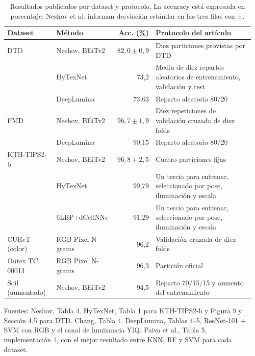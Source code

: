 \documentclass[a4paper,fleqn]{cas-sc}
\begin{document}
\begin{table}[pos=htbp]
\centering
\caption{Resultados publicados por dataset y protocolo. La accuracy está expresada en porcentaje. Neshov et al. informan desviación estándar en las tres filas con $\pm$.}
\label{tab:publicados}
\small
\setlength{\tabcolsep}{4pt}
\begin{tabular}{@{}p{}p{}r p{}@{}}
\toprule
Dataset & Método & Acc. (\%) & Protocolo del artículo \\
\midrule
DTD & Neshov, BEiTv2 \citep{neshov2025aggregation} & $82{,}0\pm0{,}9$ & Diez particiones provistas por DTD \\
 & HyTexNet \citep{gupta2026hytexnet} & 73,2 & Media de diez repartos aleatorios de entrenamiento, validación y test \\
 & DeepLumina \citep{simon2022deeplumina} & 73,63 & Reparto aleatorio 80/20 \\
\addlinespace
FMD & Neshov, BEiTv2 \citep{neshov2025aggregation} & $96{,}7\pm1{,}9$ & Diez repeticiones de validación cruzada de diez folds \\
 & DeepLumina \citep{simon2022deeplumina} & 90,15 & Reparto aleatorio 80/20 \\
\addlinespace
KTH-TIPS2-b & Neshov, BEiTv2 \citep{neshov2025aggregation} & $96{,}8\pm2{,}5$ & Cuatro particiones fijas \\
 & HyTexNet \citep{gupta2026hytexnet} & 99,79 & Un tercio para entrenar, seleccionado por pose, iluminación y escala \\
 & 6LBP+dCellNNs \citep{chang2024cellnn} & 91,29 & Un tercio para entrenar, seleccionado por pose, iluminación y escala \\
\addlinespace
CUReT (color) & RGB Pixel N-grams \citep{paiva2023rgb} & 96,2 & Validación cruzada de diez folds \\
Outex TC 00013 & RGB Pixel N-grams \citep{paiva2023rgb} & 96,3 & Partición oficial \\
Soil (aumentado) & Neshov, BEiTv2 \citep{neshov2025aggregation} & 94,5 & Reparto 70/15/15 y aumento del entrenamiento \\
\bottomrule
\end{tabular}

\medskip
\begin{minipage}{.97\textwidth}\footnotesize
Fuentes: Neshov, Tabla 4. HyTexNet, Tabla 1 para KTH-TIPS2-b y Figura 9 y Sección 4.5 para DTD. Chang, Tabla 4. DeepLumina, Tablas 4--5, ResNet-101 + SVM con RGB y el canal de luminancia YIQ. Paiva et al., Tabla 5, implementación 1, con el mejor resultado entre KNN, RF y SVM para cada dataset.
\end{minipage}
\end{table}
\FloatBarrier
\end{document}
